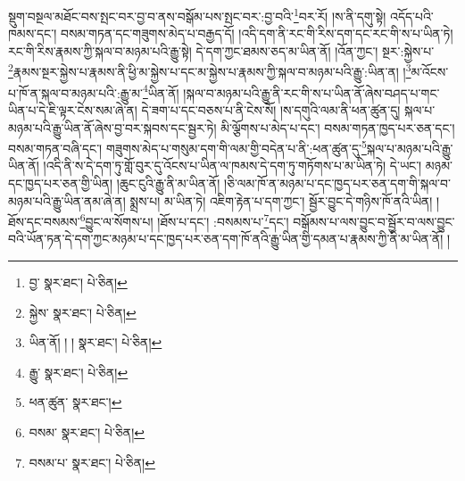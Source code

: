 སྡུག་བསྔལ་མཐོང་བས་སྤང་བར་བྱ་བ་ནས་བསྒོམ་པས་སྤང་བར་:བྱ་བའི་\footnote{བྱ་  སྣར་ཐང་།  པེ་ཅིན། }བར་རོ། །ས་ནི་དགུ་སྟེ། འདོད་པའི་ཁམས་དང་། བསམ་གཏན་དང་གཟུགས་མེད་པ་བརྒྱད་དོ། །འདི་དག་ནི་རང་གི་རིས་དག་དང་རང་གི་ས་པ་ཡིན་ཏེ། རང་གི་རིས་རྣམས་ཀྱི་སྐལ་བ་མཉམ་པའི་རྒྱུ་སྟེ། དེ་དག་ཀྱང་ཐམས་ཅད་མ་ཡིན་ནོ། །འོན་ཀྱང་། སྔར་:སྐྱེས་པ་\footnote{སྐྱེས་  སྣར་ཐང་།  པེ་ཅིན། }རྣམས་སྔར་སྐྱེས་པ་རྣམས་ནི་ཕྱི་མ་སྐྱེས་པ་དང་མ་སྐྱེས་པ་རྣམས་ཀྱི་སྐལ་བ་མཉམ་པའི་རྒྱུ་:ཡིན་ན། །\footnote{ཡིན་ནོ། ། །  སྣར་ཐང་།  པེ་ཅིན། }མ་འོངས་པ་ཁོ་ན་སྐལ་བ་མཉམ་པའི་:རྒྱུ་མ་\footnote{རྒྱུ་  སྣར་ཐང་།  པེ་ཅིན། }ཡིན་ནོ། །སྐལ་བ་མཉམ་པའི་རྒྱུ་ནི་རང་གི་ས་པ་ཡིན་ནོ་ཞེས་བཤད་པ་གང་ཡིན་པ་དེ་ཇི་ལྟར་ངེས་སམ་ཞེ་ན། དེ་ཟག་པ་དང་བཅས་པ་ནི་ངེས་སོ། །ས་དགུའི་ལམ་ནི་ཕན་ཚུན་དུ། སྐལ་པ་མཉམ་པའི་རྒྱུ་ཡིན་ནོ་ཞེས་བྱ་བར་སྐབས་དང་སྦྱར་ཏེ། མི་ལྕོགས་པ་མེད་པ་དང་། བསམ་གཏན་ཁྱད་པར་ཅན་དང་། བསམ་གཏན་བཞི་དང་། གཟུགས་མེད་པ་གསུམ་དག་གི་ལམ་གྱི་བདེན་པ་ནི་:ཕན་ཚུན་དུ་\footnote{ཕན་ཚུན་  སྣར་ཐང་། }སྐལ་པ་མཉམ་པའི་རྒྱུ་ཡིན་ནོ། །འདི་ནི་ས་དེ་དག་ཏུ་གློ་བུར་དུ་འོངས་པ་ཡིན་ལ་ཁམས་དེ་དག་ཏུ་གཏོགས་པ་མ་ཡིན་ཏེ། དེ་ཡང་། མཉམ་དང་ཁྱད་པར་ཅན་གྱི་ཡིན། །ཆུང་ངུའི་རྒྱུ་ནི་མ་ཡིན་ནོ། །ཅི་ལམ་ཁོ་ན་མཉམ་པ་དང་ཁྱད་པར་ཅན་དག་གི་སྐལ་བ་མཉམ་པའི་རྒྱུ་ཡིན་ནམ་ཞེ་ན། སྨྲས་པ། མ་ཡིན་ཏེ། འཇིག་རྟེན་པ་དག་ཀྱང་། སྦྱོར་བྱུང་དེ་གཉིས་ཁོ་ནའི་ཡིན། །ཐོས་དང་བསམས་\footnote{བསམ་  སྣར་ཐང་།  པེ་ཅིན། }བྱུང་ལ་སོགས་པ། །ཐོས་པ་དང་། :བསམས་པ་\footnote{བསམ་པ་  སྣར་ཐང་།  པེ་ཅིན། }དང་། བསྒོམས་པ་ལས་བྱུང་བ་སྦྱོར་བ་ལས་བྱུང་བའི་ཡོན་ཏན་དེ་དག་ཀྱང་མཉམ་པ་དང་ཁྱད་པར་ཅན་དག་ཁོ་ནའི་རྒྱུ་ཡིན་གྱི་དམན་པ་རྣམས་ཀྱི་ནི་མ་ཡིན་ནོ། །
